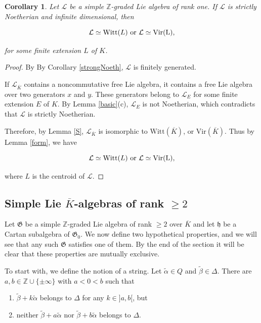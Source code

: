 \documentclass[11pt, letterpaper, reqno]{amsart}
\newtheorem{cor}[theorem]{Corollary}
\theoremstyle{definition}
\newcommand{\Z}{{\mathbb Z}}
\newcommand{\cL}{\mathcal L}
\newcommand{\fh}{\mathfrak{h}}
\newcommand{\fG}{\mathfrak{G}}
\newcommand{\Vir}{\mathrm{Vir}}
\newcommand{\Witt}{\mathrm{Witt}}
\begin{document}
\begin{cor}\label{rk1} Let $\cL$ be a simple $\Z$-graded Lie algebra of rank one. If $\cL$ is 
strictly Noetherian
and infinite dimensional, then

$$\cL\simeq\Witt(L)\rm{\,\,or\,\,} 
\cL\simeq\Vir(L),$$

\noindent for some finite extension $L$ of $K$.
\end{cor}

\begin{proof} By By Corollary \ref{strongNoeth}, $\cL$ is finitely generated. 

If  $\cL_{\overline K}$ contains a noncommutative free Lie algebra, it contains a free
 Lie algebra over two generators $x$ and $y$.
 These generators belong to
$\cL_E$ for some finite extension
$E$ of $K$. By Lemma \ref{basic}(c), 
$\cL_E$ is not Noetherian, which contradicts that $\cL$ is strictly Noetherian.

Therefore, by Lemma \ref{S}, 
$\cL_{\overline{K}}$ is isomorphic to 
$\Witt(\overline{K})$, or $\Vir(\overline{K})$.
Thus by Lemma \ref{form}, we have

$$\cL\simeq\Witt(L)\rm{\,\,or\,\,} 
\cL\simeq\Vir(L),$$

\noindent where $L$ is the centroid of $\cL$.
\end{proof}

\subsection{Simple Lie $\overline{K}$-algebras of rank $\geq 2$ }

\medbreak
\noindent Let $\fG$ be a simple 
$\Z$-graded Lie algebra of rank $\geq 2$
over $\overline{K}$ and let $\fh$ be a Cartan subalgebra of $\fG_0$.
We now define two hypothetical properties, and we will see that
any such $\fG$ satisfies one of them.
By the end of the section it will be clear that these properties are mutually exclusive.

\medbreak
To start with, we define the notion of a string. Let $\widetilde\alpha\in Q$ and 
$\widetilde\beta\in \Delta$.
There are $a,b\in\Z\cup\{\pm\infty\}$
with $a<0<b$ such that

\begin{enumerate}[leftmargin=*,label=\rm{(\roman*)}]
\item $\widetilde\beta+k\widetilde\alpha$ belongs to $\Delta$ for any $k\in]a,b[$, but
	
\medbreak
\item neither 
$\widetilde\beta+a\widetilde\alpha$ nor
$\widetilde\beta+b\widetilde\alpha$ belongs to 
$\Delta$.
\end{enumerate}
\end{document}
